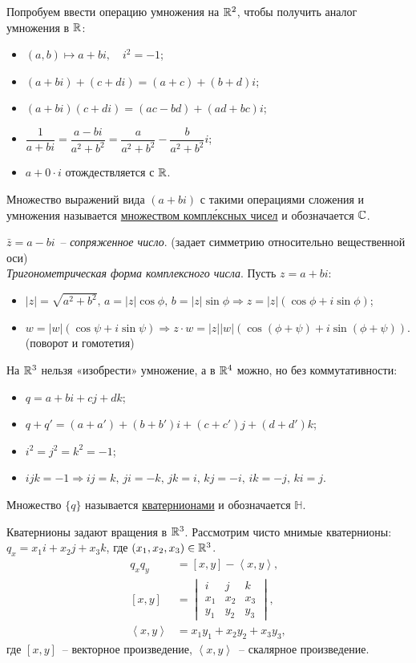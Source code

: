 Попробуем ввести операцию умножения на $\mathbb{R}^2$, чтобы получить аналог умножения в $\mathbb{R}$:
\begin{itemize}
	\item $(a, b) \mapsto a+bi, \quad i^2 = -1$;
	\item $(a+bi) + (c+di) = (a+c) + (b+d)i$;
	\item $(a+bi)(c+di) = (ac-bd) + (ad+bc)i$;
	\item $\dfrac{1}{a+bi} = \dfrac{a-bi}{a^2+b^2} = \dfrac{a}{a^2+b^2} - \dfrac{b}{a^2+b^2}i$;
	\item $a + 0 \cdot i$ отождествляется с $\mathbb{R}$.
\end{itemize}
\begin{defin}
	Множество выражений вида $(a+bi)$ с такими операциями сложения и умножения называется \underline{множеством компл\'{е}ксных чисел} и обозначается $\mathbb{C}$.
\end{defin}

$\bar{z} = a-bi$~-- \textit{сопряженное число}. (задает симметрию относительно вещественной оси)\\

\textit{Тригонометрическая форма комплексного числа}. Пусть $z = a+bi$:
\begin{itemize}
	\item $|z| = \sqrt{a^2+b^2},\, a = |z| \cos{\phi},\, b = |z| \sin{\phi} \Rightarrow z = |z|( \cos{\phi} + i \sin{\phi} )$;
	\item $w = |w|( \cos{\psi} + i \sin{\psi} ) \Rightarrow z \cdot w = |z||w| ( \cos{(\phi + \psi)} + i \sin{(\phi + \psi)} )$. (поворот и гомотетия)\\
\end{itemize}

На $\mathbb{R}^3$ нельзя «изобрести» умножение, а в $\mathbb{R}^4$ можно, но без коммутативности:
\begin{itemize}
	\item $q = a+bi+cj+dk$;
	\item $q+q' = (a+a') + (b+b')i + (c+c')j + (d+d')k$;
	\item $i^2=j^2=k^2=-1$;
	\item $ijk=-1 \Rightarrow ij=k,\, ji=-k,\, jk=i,\, kj = -i,\, ik=-j,\, ki=j$.
\end{itemize}
\begin{defin}
	Множество $\{q\}$ называется \underline{кватернионами} и обозначается $\mathbb{H}$.
\end{defin}

Кватернионы задают вращения в $\mathbb{R}^3$. Рассмотрим чисто мнимые кватернионы: $q_x = x_1i + x_2j +x_3k$, где $(x_1, x_2, x_3) \in \mathbb{R}^3$.
\begin{align*}
	q_x q_y &= [x,y] - \left< x,y \right>,\\
	[x,y] &= \begin{vmatrix}
	i & j & k \\ 
	x_1 & x_2 & x_3 \\ 
	y_1 & y_2 & y_3
	\end{vmatrix},\\
	\left< x,y \right> &= x_1y_1 + x_2y_2 + x_3y_3,
\end{align*}
где $[x,y]$~-- векторное произведение, $\left< x,y \right>$~-- скалярное произведение.


